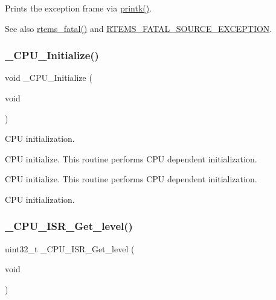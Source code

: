 Prints the exception frame via \mbox{\hyperlink{bspIo_8h_a380cfecc8035cec8a13b68c0cb90f32f}{printk()}}. 

\begin{DoxySeeAlso}{See also}
\mbox{\hyperlink{group__ClassicFatal_ga53fa9338246642e0d931f61314c6609e}{rtems\+\_\+fatal()}} and \mbox{\hyperlink{group__RTEMSScoreIntErr_gga878b4de77df7d0b83d19609d4de42c26a131fe6aad46a1394f8bb0f2a5f19fa05}{R\+T\+E\+M\+S\+\_\+\+F\+A\+T\+A\+L\+\_\+\+S\+O\+U\+R\+C\+E\+\_\+\+E\+X\+C\+E\+P\+T\+I\+ON}}. 
\end{DoxySeeAlso}
\mbox{\label{group__RTEMSScoreCPUEpiphany_ga869484e3d851b032fd826c69ff21fc72}} 
\subsubsection{\texorpdfstring{\_CPU\_Initialize()}{\_CPU\_Initialize()}}
{\footnotesize\ttfamily void \+\_\+\+C\+P\+U\+\_\+\+Initialize (\begin{DoxyParamCaption}\item[{void}]{ }\end{DoxyParamCaption})}



C\+PU initialization. 

C\+PU initialize. This routine performs C\+PU dependent initialization.

C\+PU initialize. This routine performs C\+PU dependent initialization.

C\+PU initialization. \mbox{\label{group__RTEMSScoreCPUEpiphany_ga1d9dcab9170d532b6634a5620385adbd}} 
\subsubsection{\texorpdfstring{\_CPU\_ISR\_Get\_level()}{\_CPU\_ISR\_Get\_level()}}
{\footnotesize\ttfamily uint32\+\_\+t \+\_\+\+C\+P\+U\+\_\+\+I\+S\+R\+\_\+\+Get\+\_\+level (\begin{DoxyParamCaption}\item[{void}]{ }\end{DoxyParamCaption})}

